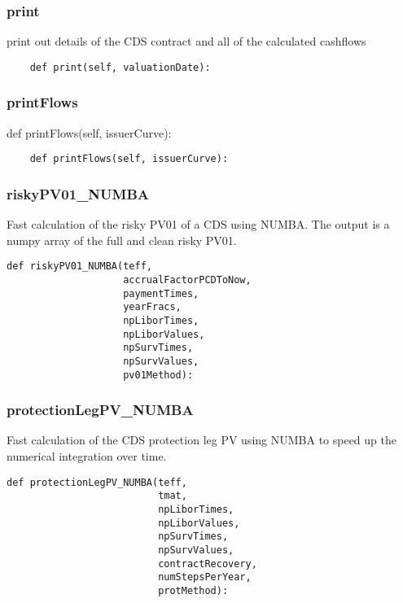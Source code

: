 \documentclass[twoside,11pt]{book}
\begin{document}
\subsubsection*{{\bf print}}
print out details of the CDS contract and all of the calculated cashflows  

\begin{lstlisting}
    def print(self, valuationDate):
\end{lstlisting}

\subsubsection*{{\bf printFlows}}
def printFlows(self, issuerCurve): 

\begin{lstlisting}
    def printFlows(self, issuerCurve):
\end{lstlisting}

\subsubsection*{{\bf riskyPV01\_NUMBA}}
Fast calculation of the risky PV01 of a CDS using NUMBA. The output is a numpy array of the full and clean risky PV01. 

\begin{lstlisting}
def riskyPV01_NUMBA(teff,
                    accrualFactorPCDToNow,
                    paymentTimes,
                    yearFracs,
                    npLiborTimes,
                    npLiborValues,
                    npSurvTimes,
                    npSurvValues,
                    pv01Method):
\end{lstlisting}

\subsubsection*{{\bf protectionLegPV\_NUMBA}}
Fast calculation of the CDS protection leg PV using NUMBA to speed up the numerical integration over time.  

\begin{lstlisting}
def protectionLegPV_NUMBA(teff,
                          tmat,
                          npLiborTimes,
                          npLiborValues,
                          npSurvTimes,
                          npSurvValues,
                          contractRecovery,
                          numStepsPerYear,
                          protMethod):
\end{lstlisting}
\end{document}
